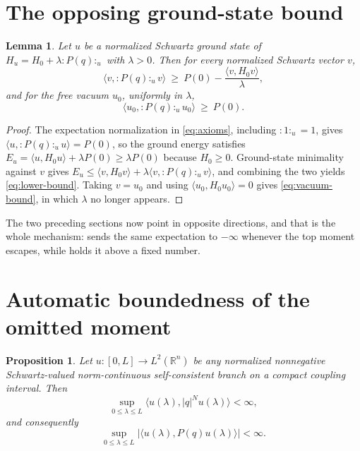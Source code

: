 \documentclass[11pt,reqno]{amsart}
\theoremstyle{plain}
\newtheorem{lemma}[theorem]{Lemma}
\newtheorem{proposition}[theorem]{Proposition}
\theoremstyle{definition}
\theoremstyle{remark}
\numberwithin{equation}{section}
\begin{document}
\section{The opposing ground-state bound}
\label{sec:opposing}

\begin{lemma}
  \label{lem:lower}
  Let $u$ be a normalized Schwartz ground state of
  $H_u=H_0+\lambda:P(q):_u$ with $\lambda>0$. Then for every normalized
  Schwartz vector $v$,
  \begin{equation}
    \label{eq:lower-bound}
    \langle v,:P(q):_u v\rangle
    \ \ge\ P(0)-\frac{\langle v,H_0v\rangle}{\lambda},
  \end{equation}
  and for the free vacuum $u_0$, uniformly in $\lambda$,
  \begin{equation}
    \label{eq:vacuum-bound}
    \langle u_0,:P(q):_u u_0\rangle\ \ge\ P(0).
  \end{equation}
\end{lemma}

\begin{proof}
  The expectation normalization in \eqref{eq:axioms}, including
  $:1:_u=1$, gives $\langle u,:P(q):_u u\rangle=P(0)$, so the ground energy
  satisfies
  $E_u=\langle u,H_0u\rangle+\lambda P(0)\ge\lambda P(0)$ because
  $H_0\ge0$. Ground-state minimality against $v$ gives
  $E_u\le\langle v,H_0v\rangle+\lambda\langle v,:P(q):_u v\rangle$, and
  combining the two yields \eqref{eq:lower-bound}. Taking $v=u_0$ and using
  $\langle u_0,H_0u_0\rangle=0$ gives \eqref{eq:vacuum-bound}, in which
  $\lambda$ no longer appears.
\end{proof}

The two preceding sections now point in opposite directions, and that is the
whole mechanism:  sends the same expectation to
$-\infty$ whenever the top moment escapes, while  holds it
above a fixed number.

\section{Automatic boundedness of the omitted moment}
\label{sec:automatic}

\begin{proposition}
  \label{prop:bounded}
  Let $u:[0,L]\to L^2(\mathbb R^n)$ be any normalized nonnegative
  Schwartz-valued norm-continuous self-consistent branch on a compact
  coupling interval. Then
  \begin{equation}
    \label{eq:top-bounded}
    \sup_{0\le\lambda\le L}\langle u(\lambda),|q|^Nu(\lambda)\rangle<\infty,
  \end{equation}
  and consequently
  \begin{equation}
    \label{eq:P-bounded}
    \sup_{0\le\lambda\le L}
      \bigl|\langle u(\lambda),P(q)u(\lambda)\rangle\bigr|<\infty .
  \end{equation}
\end{proposition}
\end{document}
